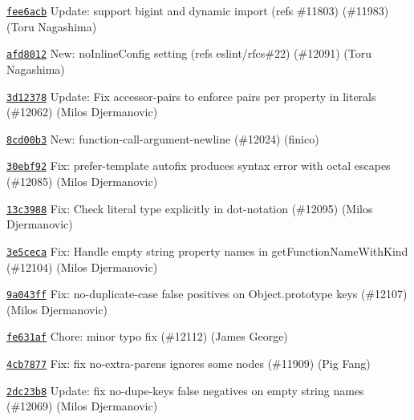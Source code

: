 \begin{DoxyItemize}
\item \href{https://github.com/eslint/eslint/commit/fee6acbe13cecd4c028e681e185fc6a6d6ba9452}{\texttt{ {\ttfamily fee6acb}}} Update\+: support bigint and dynamic import (refs \#11803) (\#11983) (Toru Nagashima)
\item \href{https://github.com/eslint/eslint/commit/afd8012c2797f2f5bf3c360cb241ea2ba6e1a489}{\texttt{ {\ttfamily afd8012}}} New\+: no\+Inline\+Config setting (refs eslint/rfcs\#22) (\#12091) (Toru Nagashima)
\item \href{https://github.com/eslint/eslint/commit/3d12378221961439c27ddae0ecda9845ac575107}{\texttt{ {\ttfamily 3d12378}}} Update\+: Fix accessor-\/pairs to enforce pairs per property in literals (\#12062) (Milos Djermanovic)
\item \href{https://github.com/eslint/eslint/commit/8cd00b308987e0db0bdb2e242bf13b2b07b350bd}{\texttt{ {\ttfamily 8cd00b3}}} New\+: function-\/call-\/argument-\/newline (\#12024) (finico)
\item \href{https://github.com/eslint/eslint/commit/30ebf929f60684520b1201c1adfd86214c19d614}{\texttt{ {\ttfamily 30ebf92}}} Fix\+: prefer-\/template autofix produces syntax error with octal escapes (\#12085) (Milos Djermanovic)
\item \href{https://github.com/eslint/eslint/commit/13c3988a4001ae368ea7b6c8d3dd0abfa7c6cf64}{\texttt{ {\ttfamily 13c3988}}} Fix\+: Check literal type explicitly in dot-\/notation (\#12095) (Milos Djermanovic)
\item \href{https://github.com/eslint/eslint/commit/3e5ceca4d2284b55a2292a1d3de9aa4cdf6fa213}{\texttt{ {\ttfamily 3e5ceca}}} Fix\+: Handle empty string property names in get\+Function\+Name\+With\+Kind (\#12104) (Milos Djermanovic)
\item \href{https://github.com/eslint/eslint/commit/9a043ffbb864fc65baeb16fe5668435e3b7cfe34}{\texttt{ {\ttfamily 9a043ff}}} Fix\+: no-\/duplicate-\/case false positives on Object.\+prototype keys (\#12107) (Milos Djermanovic)
\item \href{https://github.com/eslint/eslint/commit/fe631afee59641876598d19b1935967099cc6fa0}{\texttt{ {\ttfamily fe631af}}} Chore\+: minor typo fix (\#12112) (James George)
\item \href{https://github.com/eslint/eslint/commit/4cb78774f6cc687a3c8701462f8c7f7b587ecaf0}{\texttt{ {\ttfamily 4cb7877}}} Fix\+: fix no-\/extra-\/parens ignores some nodes (\#11909) (Pig Fang)
\item \href{https://github.com/eslint/eslint/commit/2dc23b81e54defbce7a70a7f26c2e4c7b692cf58}{\texttt{ {\ttfamily 2dc23b8}}} Update\+: fix no-\/dupe-\/keys false negatives on empty string names (\#12069) (Milos Djermanovic)

\end{DoxyItemize}
